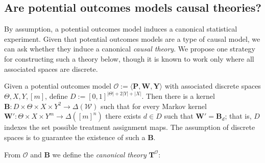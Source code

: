 
\subsection{Are potential outcomes models causal theories?}

By assumption, a potential outcomes model induces a canonical statistical experiment. Given that potential outcomes models are a type of causal model, we can ask whether they induce a canonical \emph{causal theory}. We propose one strategy for constructing such a theory below, though it is known to work only where all associated spaces are discrete.

Given a potential outcomes model $\mathscr{O}:=\langle \mathbf{P}, \mathbf{W}, \mathbf{Y} \rangle$ with associated discrete spaces $\Theta,X,Y,[m]$, define $D:=[0,1]^{|\Theta|+2|Y|+|X|}$. Then there is a kernel $\mathbf{B}:D\times\Theta\times X \times Y^2\to \Delta(\mathcal{W})$ such that for every Markov kernel $\mathbf{W}':\Theta\times X\times Y^m\to \Delta([m]^n)$ there exists $d\in D$ such that $\mathbf{W}'=\mathbf{B}_d$; that is, $D$ indexes the set possible treatment assignment maps. The assumption of discrete spaces is to guarantee the existence of such a $\mathbf{B}$.

From $\mathscr{O}$ and $\mathbf{B}$ we define the \emph{canonical theory} $\mathbf{T}^{\mathscr{O}}$:


